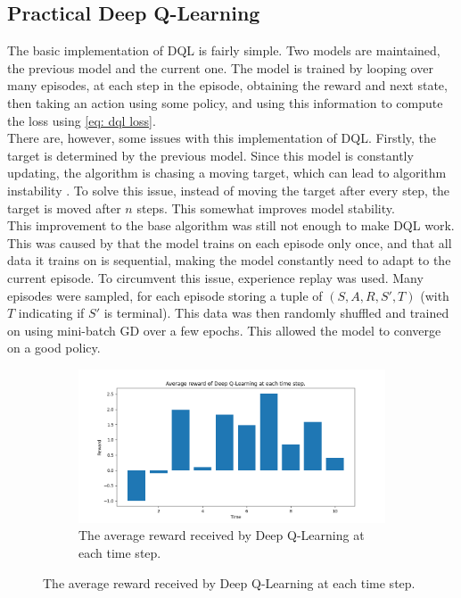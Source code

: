 \documentclass{class}
\begin{document}
\begin{appendices}
\subsection{Practical Deep Q-Learning}
The basic implementation of DQL is fairly simple. Two models are maintained, the previous model and the current one. The model is trained by looping over many episodes, at each step in the episode, obtaining the reward and next state, then taking an action using some policy, and using this information to compute the loss using \autoref{eq: dql loss}. 
\\[0.3cm]
There are, however, some issues with this implementation of DQL. Firstly, the target is determined by the previous model. Since this model is constantly updating, the algorithm is chasing a moving target, which can lead to algorithm instability \parencite{lecture6}. To solve this issue, instead of moving the target after every step, the target is moved after $n$ steps. This somewhat improves model stability.
\\[0.3cm]
This improvement to the base algorithm was still not enough to make DQL work. This was caused by that the model trains on each episode only once, and that all data it trains on is sequential, making the model constantly need to adapt to the current episode. To circumvent this issue, experience replay was used. Many episodes were sampled, for each episode storing a tuple of $(S, A, R, S', T)$ (with $T$ indicating if $S'$ is terminal). This data was then randomly shuffled and trained on using mini-batch GD over a few epochs. This allowed the model to converge on a good policy.
\begin{figure}[H]
    \centering
    \begin{subfigure}[t]{0.47\linewidth}
        \centering
        \includegraphics[width=1\linewidth]{../plots/r_over_time/deep_q_learning_r_over_time.png}
        \caption{The average reward received by Deep Q-Learning at each time step.}

\end{subfigure}
\end{figure}
\end{appendices}
\end{document}
